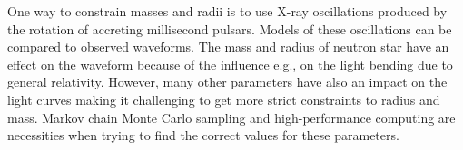 \documentclass{wihuri}
\begin{document}
One way to constrain masses and radii is to use X-ray oscillations produced by the rotation of accreting millisecond pulsars. Models of these oscillations can be compared to observed waveforms.  
The mass and radius of neutron star have an effect on the waveform because of the influence e.g., on the light bending due to general relativity. However, many other parameters have also an impact on the light curves making it challenging to get more strict constraints to radius and mass. Markov chain Monte Carlo sampling and high-performance computing are necessities when trying to find the correct values for these parameters. 








\vspace{10cm}











\iffalse 
\end{document}
